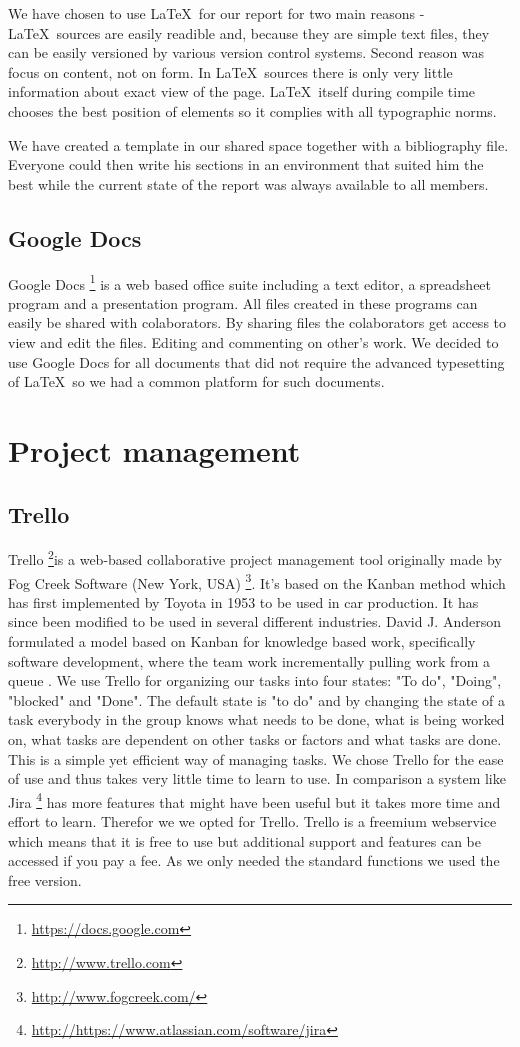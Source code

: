 \documentclass[11pt,a4paper,titlepage,oneside]{report}
\begin{document}
  We have chosen to use \LaTeX~for our report for two main reasons - \LaTeX~sources are easily readible and, because they are simple text files, they can be easily versioned by various version control systems. Second reason was focus on content, not on form. In \LaTeX~sources there is only very little information about exact view of the page. \LaTeX~itself during compile time chooses the best position of elements so it complies with all typographic norms.

  We have created a template in our shared space together with a bibliography file. Everyone could then write his sections in an environment that suited him the best while the current state of the report was always available to all members.

  \subsection{Google Docs}
  Google Docs \footnote{\url{https://docs.google.com}} is a web based office suite including a text editor, a spreadsheet program and a presentation program. All files created in these programs can easily be shared with colaborators. By sharing files the colaborators get access to view and edit the files. Editing and commenting on other's work. We decided to use Google Docs for all documents that did not require the advanced typesetting of \LaTeX~so we had a common platform for such documents.

\section{Project management}
  \subsection{Trello}
  Trello \footnote{\url{http://www.trello.com}}is a web-based collaborative project management tool originally made by Fog Creek Software (New York, USA) \footnote{\url{http://www.fogcreek.com/}}. 
It's based on the Kanban method which has first implemented by Toyota in 1953 to be used in car production. It has since been modified to be used in several different industries. 
David J. Anderson formulated a model based on Kanban for knowledge based work, specifically software development, where the team work incrementally pulling work from a queue \cite{da2004}. 
We use Trello for organizing our tasks into four states: "To do", "Doing", "blocked" and "Done". The default state is "to do" and by changing the state of a task everybody in the group knows what needs to be done, what is being worked on, what tasks are dependent on other tasks or factors and what tasks are done.
This is a simple yet efficient way of managing tasks. We chose Trello for the ease of use and thus takes very little time to learn to use. In comparison a system like Jira \footnote{\url{http://https://www.atlassian.com/software/jira}} has more features that might have been useful but it takes more time and effort to learn. Therefor we we opted for Trello.
Trello is a freemium webservice which means that it is free to use but additional support and features can be accessed if you pay a fee. As we only needed the standard functions we used the free version.
\end{document}
